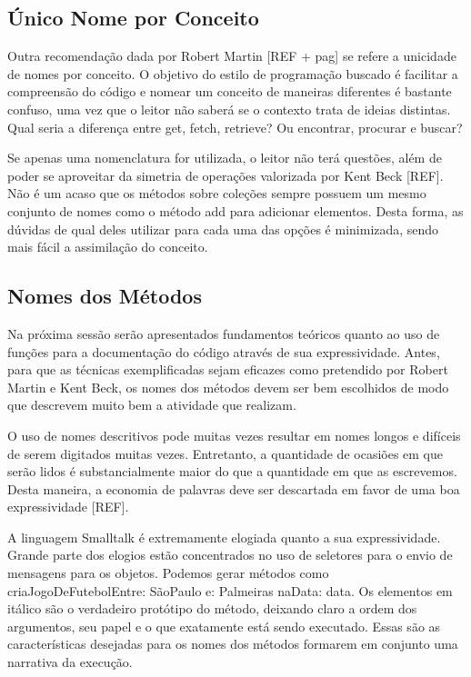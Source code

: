 \subsection{Único Nome por Conceito}
	Outra recomendação dada por Robert Martin [REF + pag] se refere a unicidade de nomes por conceito. O objetivo do estilo de programação buscado é facilitar a compreensão do código e nomear um conceito de maneiras diferentes é bastante confuso, uma vez que o leitor não saberá se o contexto trata de ideias distintas. Qual seria a diferença entre get, fetch, retrieve? Ou encontrar, procurar e buscar?
	
	Se apenas uma nomenclatura for utilizada, o leitor não terá questões, além de poder se aproveitar da simetria de operações valorizada por Kent Beck [REF]. Não é um acaso que os métodos sobre coleções sempre possuem um mesmo conjunto de nomes como o método add para adicionar elementos. Desta forma, as dúvidas de qual deles utilizar para cada uma das opções é minimizada, sendo mais fácil a assimilação do conceito.

\subsection{Nomes dos Métodos}
	Na próxima sessão serão apresentados fundamentos teóricos quanto ao uso de funções para a documentação do código através de sua expressividade. Antes, para que as técnicas exemplificadas sejam eficazes como pretendido por Robert Martin e Kent Beck, os nomes dos métodos devem ser bem escolhidos de modo que descrevem muito bem a atividade que realizam.
	
	O uso de nomes descritivos pode muitas vezes resultar em nomes longos e difíceis de serem digitados muitas vezes. Entretanto, a quantidade de ocasiões em que serão lidos é substancialmente maior do que a quantidade em que as escrevemos. Desta maneira, a economia de palavras deve ser descartada em favor de uma boa expressividade [REF].
	
	A linguagem Smalltalk é extremamente elogiada quanto a sua expressividade. Grande parte dos elogios estão concentrados no uso de seletores para o envio de mensagens para os objetos. Podemos gerar métodos como criaJogoDeFutebolEntre: SãoPaulo e: Palmeiras naData: data. Os elementos em itálico são o verdadeiro protótipo do método, deixando claro a ordem dos argumentos, seu papel e o que exatamente está sendo executado. Essas são as características desejadas para os nomes dos métodos formarem em conjunto uma narrativa da execução.

